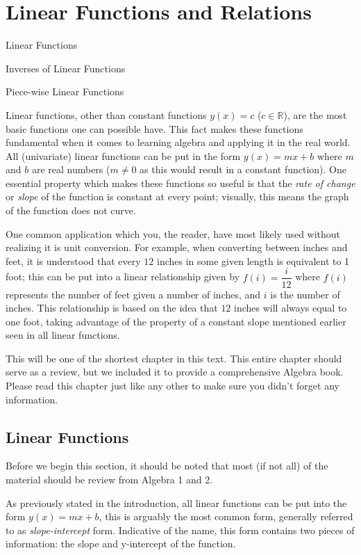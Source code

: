 \documentclass[lang=en,11pt]{elegantbook}
\begin{document}
\chapter{Linear Functions and Relations}
\begin{introduction}[Contents]
\item Linear Functions
\item Inverses of Linear Functions
\item Piece-wise Linear Functions
\end{introduction}
\noindent Linear functions, other than constant functions $y(x)=c$ ($c\in\mathbb{R}$), are the most basic functions one can possible have.  This fact makes these functions fundamental when it comes to learning algebra and applying it in the real world.  All (univariate) linear functions can be put in the form $y(x)=mx+b$ where $m$ and $b$ are real numbers ($m\neq 0$ as this would result in a constant function).  One essential property which makes these functions so useful is that the \textit{rate of change} or \textit{slope} of the function is constant at every point; visually, this means the graph of the function does not curve.  

One common application which you, the reader, have most likely used without realizing it is unit conversion.  For example, when converting between inches and feet, it is understood that every $12$ inches in some given length is equivalent to 1 foot; this can be put into a linear relationship given by $f(i)=\dfrac{i}{12}$ where $f(i)$ represents the number of feet given a number of inches, and $i$ is the number of inches.  This relationship is based on the idea that $12$ inches will always equal to one foot, taking advantage of the property of a constant slope mentioned earlier seen in all linear functions.

This will be one of the shortest chapter in this text.  This entire chapter should serve as a review, but we included it to provide a comprehensive Algebra book.  Please read this chapter just like any other to make sure you didn't forget any information.
\section{Linear Functions}
\noindent Before we begin this section, it should be noted that most (if not all) of the material should be review from Algebra 1 and 2.

As previously stated in the introduction, all linear functions can be put into the form $y(x)=mx+b$, this is arguably the most common form, generally referred to as \textit{slope-intercept} form.  Indicative of the name, this form contains two pieces of information: the slope and y-intercept of the function.
\end{document}
